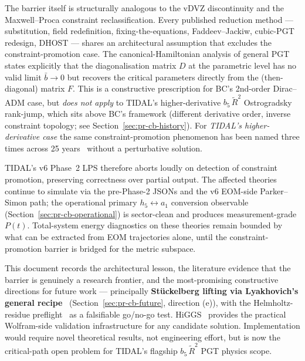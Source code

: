 The barrier itself is structurally analogous to the vDVZ discontinuity
and the Maxwell--Proca constraint reclassification.  Every published
reduction method --- substitution, field redefinition,
fixing-the-equations, Faddeev--Jackiw, cubic-PGT redesign, DHOST ---
shares an architectural assumption that excludes the
constraint-promotion case.  The canonical-Hamiltonian
analysis of general PGT~\cite{BlagojevicCvetkovic2018} states
explicitly that the diagonalisation matrix $D$ at the parametric level
has no valid limit $\bar{b} \to 0$ but recovers the critical parameters
directly from the (then-diagonal) matrix $F$.  This is a constructive
prescription for BC's 2nd-order Dirac--ADM case, but
\emph{does not apply} to TIDAL's higher-derivative
$b_5\,\tilde{R}^2$ Ostrogradsky rank-jump, which sits above BC's
framework (different derivative order, inverse constraint topology;
see Section~\ref{sec:pr-cb-history}).
For \emph{TIDAL's higher-derivative case} the same constraint-promotion
phenomenon has been named three times across 25
years~\cite{BlagojevicNikolic1983,BlagojevicNikolic1983Nuovo,YoNester1999,YoNester2002,BlagojevicCvetkovic2018}
without a perturbative solution.

TIDAL's v6 Phase~2 LPS therefore aborts loudly on detection of
constraint promotion, preserving correctness over partial output.
The affected theories continue to simulate via the pre-Phase-2 JSONs and
the v6 EOM-side Parker--Simon path; the operational primary
$h_5 \leftrightarrow a_1$ conversion observable
(Section~\ref{sec:pr-cb-operational}) is sector-clean and produces
measurement-grade $P(t)$.  Total-system energy diagnostics on these
theories remain bounded by what can be extracted from EOM
trajectories alone, until the constraint-promotion barrier is bridged
for the metric subspace.

This document records the architectural lesson, the literature evidence
that the barrier is genuinely a research frontier, and the most-promising
constructive directions for future work --- principally
\textbf{Stückelberg lifting via Lyakhovich's general
recipe}~\cite{Lyakhovich2021} (Section~\ref{sec:pr-cb-future}, direction
(e)), with the Helmholtz-residue
preflight~\cite{KrupkaVoicu2015} as a falsifiable go/no-go test.
HiGGS~\cite{Barker:2022kdk,barker2024poincare} provides the practical
Wolfram-side validation infrastructure for any candidate solution.
Implementation would require novel theoretical results, not engineering
effort, but is now the critical-path open problem for TIDAL's flagship
$b_5\,\tilde{R}^2$ PGT physics scope.
